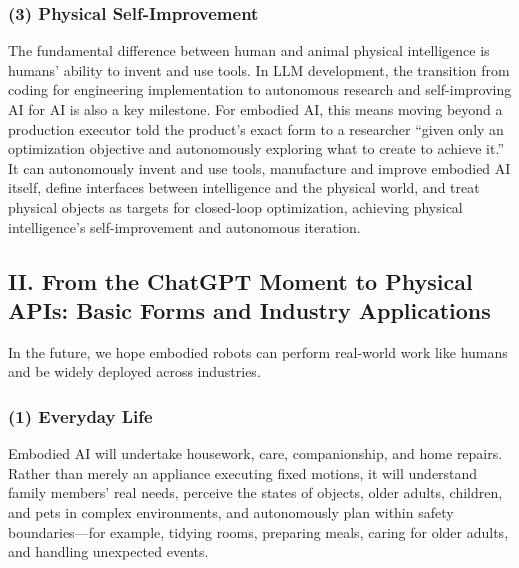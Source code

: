 \hypertarget{physical-self-improvement}{%
\subsubsection{(3) Physical Self-Improvement}\label{physical-self-improvement}}

The fundamental difference between human and animal physical intelligence is humans' ability to invent and use tools. In LLM development, the transition from coding for engineering implementation to autonomous research and self-improving AI for AI is also a key milestone. For embodied AI, this means moving beyond a production executor told the product's exact form to a researcher ``given only an optimization objective and autonomously exploring what to create to achieve it.'' It can autonomously invent and use tools, manufacture and improve embodied AI itself, define interfaces between intelligence and the physical world, and treat physical objects as targets for closed-loop optimization, achieving physical intelligence's self-improvement and autonomous iteration.

\hypertarget{ii.-from-the-chatgpt-moment-to-physical-apis-basic-forms-and-industry-applications}{%
\subsection{II. From the ChatGPT Moment to Physical APIs: Basic Forms and Industry Applications}\label{ii.-from-the-chatgpt-moment-to-physical-apis-basic-forms-and-industry-applications}}

In the future, we hope embodied robots can perform real-world work like humans and be widely deployed across industries.

\hypertarget{everyday-life}{%
\subsubsection{(1) Everyday Life}\label{everyday-life}}

Embodied AI will undertake housework, care, companionship, and home repairs. Rather than merely an appliance executing fixed motions, it will understand family members' real needs, perceive the states of objects, older adults, children, and pets in complex environments, and autonomously plan within safety boundaries---for example, tidying rooms, preparing meals, caring for older adults, and handling unexpected events.

